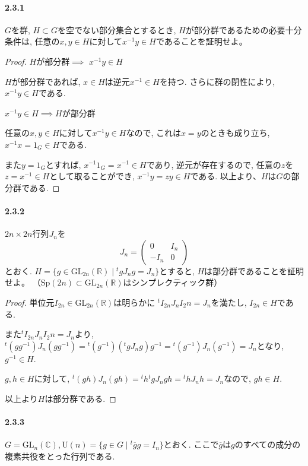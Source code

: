 \paragraph{2.3.1}  $G$を群, $H\subset G$を空でない部分集合とするとき,
$H$が部分群であるための必要十分条件は,
任意の$x,y\in H$に対して$x^{-1}y\in H$であることを証明せよ。
\begin{proof}
  $H$が部分群$\implies$ $x^{-1}y\in H$

  $H$が部分群であれば, $x \in H$は逆元$x^{-1} \in H$を持つ.
  さらに群の閉性により, $x^{-1}y \in H$である.

  $x^{-1}y\in H$$\implies$$H$が部分群 

  任意の$x,y\in H$に対して$x^{-1}y\in H$なので, 
  これは$x=y$のときも成り立ち, $x^{-1}x=1_G \in H$である.

  また$y=1_G$とすれば, $x^{-1}1_G=x^{-1} \in H$であり, 
  逆元が存在するので, 任意の$z$を$z =x^{-1} \in H$として取ることができ,
  $x^{-1}y = zy \in H$である. 以上より、$H$は$G$の部分群である.
\end{proof}\leavevmode

\paragraph{2.3.2}
$2n\times 2n$行列$J_n$を
\[J_n =  \begin{pmatrix} 0 & I_n \\ -I_n & 0 \end{pmatrix}\]
とおく.
$ H=\{g \in \mathrm{GL}_{2n}(\mathbb{R}) \mid {}^t g J_n g=J_n\} $とすると,
$H$は部分群であることを証明せよ。
（$\mathrm{Sp}(2n)\subset \mathrm{GL}_{2n}(\mathbb{R})$はシンプレクティック群）
\begin{proof}
  単位元$I_{2n} \in \mathrm{GL}_{2n}(\mathbb{R})$は明らかに
  ${}^tI_{2n}J_n I_2n = J_n$を満たし, $I_{2n} \in H$である.

  また${}^tI_{2n}J_n I_2n = J_n$より,
  $ {}^t (g g^{-1})J_n(gg^{-1})= {}^t (g^{-1})({}^t g J_n g) g^{-1}={}^t (g^{-1})J_n (g^{-1}) =J_n$となり, $g^{-1} \in H$.

  $g,h \in H$に対して, 
  ${}^t (gh)J_n (gh) = {}^t h {}^t g J_n gh = {}^t h J_n h = J_n$なので,
  $gh \in H$.

  以上より$H$は部分群である.
\end{proof}\leavevmode

\paragraph{2.3.3} 
$G=\mathrm{GL}_n(\mathbb{C}), \mathrm{U}(n)=\{g \in G \mid {}^t\overline{g} g = I_n \} $とおく.
ここで$ \overline{g} $は$g$のすべての成分の複素共役をとった行列である.

